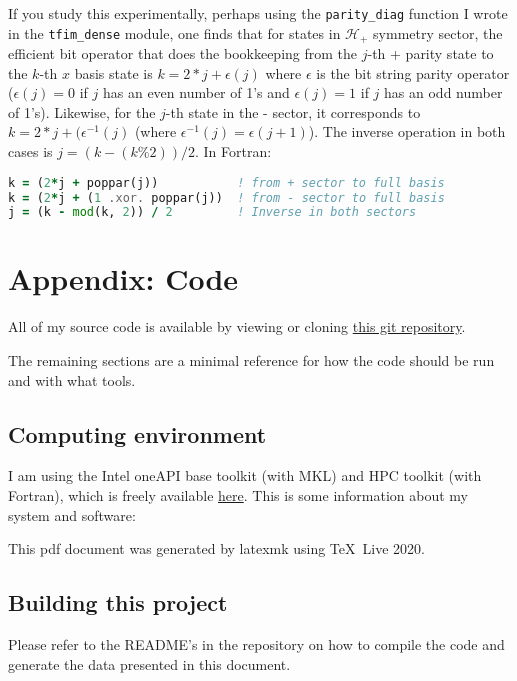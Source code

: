 \documentclass{article}
\begin{document}
If you study this experimentally, perhaps using the {\tt parity\_diag} function
I wrote in the {\tt tfim\_dense} module, one finds that for states in $\mathcal H_+$
symmetry sector, the efficient bit operator that does the bookkeeping from the $j$-th
+ parity state to the $k$-th $x$ basis state is $k = 2*j + \epsilon(j)$ where $\epsilon$
is the bit string parity operator ($\epsilon(j) = 0$ if $j$ has an even number of 1's
and $\epsilon(j) = 1$ if $j$ has an odd number of 1's).
Likewise, for the $j$-th state in the - sector, it corresponds to $k = 2*j + (\epsilon^{-1}(j)$
(where $\epsilon^{-1}(j) = \epsilon(j+1)$).
The inverse operation in both cases is $j = (k - (k \% 2)) / 2$.
In Fortran:
\begin{lstlisting}[language=Fortran]
k = (2*j + poppar(j))           ! from + sector to full basis
k = (2*j + (1 .xor. poppar(j))  ! from - sector to full basis
j = (k - mod(k, 2)) / 2         ! Inverse in both sectors
\end{lstlisting}

\newpage

\section{
Appendix: Code
}

All of my source code is available by viewing or cloning
\href{https://github.com/lxvm/ph121c.git}{this git repository}.

The remaining sections are a minimal reference for how the code
should be run and with what tools.

\subsection{
Computing environment
}

I am using the Intel oneAPI base toolkit (with MKL)
and HPC toolkit (with Fortran), which is freely available
\href{https://software.intel.com/content/www/us/en/develop/
articles/free-intel-software-developer-tools.html}{here}.
This is some information about my system and software:



This pdf document was generated by latexmk using \TeX\ Live 2020.

\subsection{
Building this project
}

Please refer to the README's in the repository on how to compile the
code and generate the data presented in this document.
\end{document}
